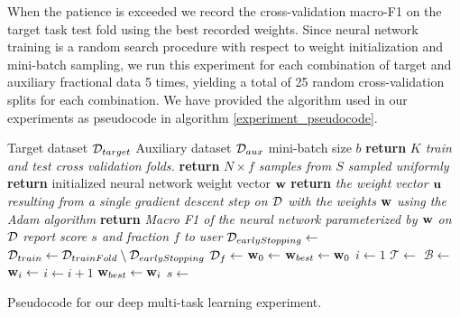 When the patience is exceeded we record the cross-validation macro-F1 on the target task test fold using the best recorded weights. Since neural network training is a random search procedure with respect to weight initialization and mini-batch sampling, we run this experiment for each combination of target and auxiliary fractional data 5 times, yielding a total of 25 random cross-validation splits for each combination. We have provided the algorithm used in our experiments as pseudocode in algorithm \ref{experiment_pseudocode}.
\begin{algorithm}
\begin{algorithmic}
	\Require Target dataset $\mathcal{D}_{target}$
	\Require Auxiliary dataset $\mathcal{D}_{aux}$
	\Require mini-batch size $b$
		\State \textbf{return} \textit{$K$ train and test cross validation folds.}
	\EndFunction
		\State \textbf{return} \textit{$N \times f$ samples from $S$ sampled uniformly}
	\EndFunction
		\State \textbf{return} initialized neural network weight vector $\mathbf{w}$
	\EndFunction
		\State \textbf{return} \textit{the weight vector $\mathbf{u}$ resulting from a single gradient descent step on $\mathcal{D}$ with the weights $\mathbf{w}$ using the Adam algorithm}
	\EndFunction
		\State \textbf{return} \textit{Macro F1 of the neural network parameterized by $\mathbf{w}$ on $\mathcal{D}$}
	\EndFunction
		\State \textit{report score $s$ and fraction $f$ to user}
	\EndFunction
				\State $\mathcal{D}_{earlyStopping} \gets$ 
				\State $\mathcal{D}_{train} \gets \mathcal{D}_{trainFold} \setminus \mathcal{D}_{earlyStopping}$
				\State $\mathcal{D}_{f} \gets $ 
				\State $\mathbf{w}_0 \gets$ 
				\State $\mathbf{w}_{best} \gets \mathbf{w}_0$
				\State $i \gets 1$
					\State $\mathcal{T} \gets$ 
					\State $\mathcal{B} \gets$ 
					\State $\mathbf{w}_i \gets$ 
					\State $i \gets i + 1$
						\State $\mathbf{w}_{best} \gets \mathbf{w}_i$
					\EndIf
				\EndWhile
				\State $s \gets$ 
				\State {}
			\EndFor
		\EndFor
	\EndFor
\end{algorithmic}
\caption{Pseudocode for our deep multi-task learning experiment.}
\label{experiment_pseudocode}
\end{algorithm}
